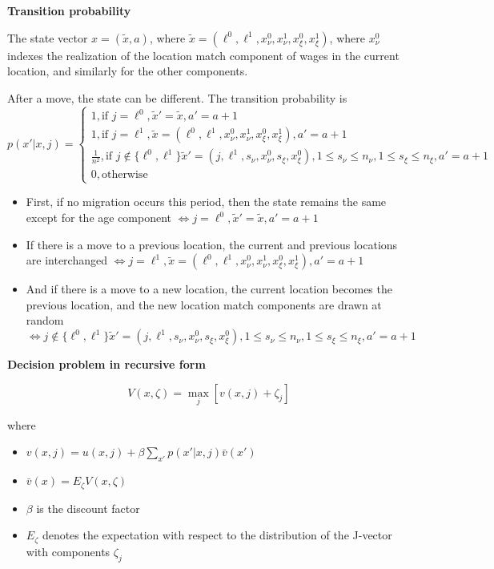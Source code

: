\documentclass{article}
\numberwithin{equation}{section} %
\begin{document}
\textbf{Transition probability}

The state vector $x=(\tilde x, a)$, where $\tilde x =(\ell^0,\ell^1,x_\nu^0,x_\nu^1,x_\xi^0,x_\xi^1)$, where $x_\nu^0$ indexes the realization of the location match component of wages in the current location, and similarly for the other components. 

After a move, the state can be different. The transition probability is 
\begin{equation}
  p(x'|x,j)=
  \begin{cases}
    1, \text{if }j=\ell^0,\tilde x'=\tilde x,a'=a+1
    \\
    1, \text{if }j=\ell^1,\tilde x =(\ell^0,\ell^1,x_\nu^0,x_\nu^1,x_\xi^0,x_\xi^1),a'=a+1
    \\
    \frac{1}{n^2}, \text{if }j \notin \{\ell^0,\ell^1\}\tilde x'=(j,\ell^1,s_\nu,x_\nu^0,s_\xi,x_\xi^0),1\leqslant s_\nu \leqslant n_\nu,1\leqslant s_\xi \leqslant n_\xi,a'=a+1
    \\
    0, \text{otherwise}
  \end{cases}
\end{equation}
\begin{itemize}
  \item First, if no migration occurs this period, then the state remains the same except for the age component $\iff j=\ell^0,\tilde x'=\tilde x,a'=a+1$
  \item If there is a move to a previous location, the current and previous locations are interchanged $\iff j=\ell^1,\tilde x =(\ell^0,\ell^1,x_\nu^0,x_\nu^1,x_\xi^0,x_\xi^1),a'=a+1$
  \item And if there is a move to a new location, the current location becomes the previous location, and the new location match components are drawn at random $\iff j \notin \{\ell^0,\ell^1\}\tilde x'=(j,\ell^1,s_\nu,x_\nu^0,s_\xi,x_\xi^0),1\leqslant s_\nu \leqslant n_\nu,1\leqslant s_\xi \leqslant n_\xi,a'=a+1$
\end{itemize}

\textbf{Decision problem in recursive form}

\begin{equation}
  V(x, \zeta) = \max_j \left[ v(x, j) + \zeta_j \right]
\end{equation}

where 
\begin{itemize}
  \item $v(x, j) = u(x, j) + \beta \sum_{x'} p(x' | x, j) \bar{v}(x')$
  \item $\bar{v}(x) = E_{\zeta} V(x, \zeta)$
  \item $\beta$ is the discount factor
  \item $E_{\zeta}$ denotes the expectation with respect to the distribution of the J-vector with components $\zeta_j$
\end{itemize}
\end{document}
